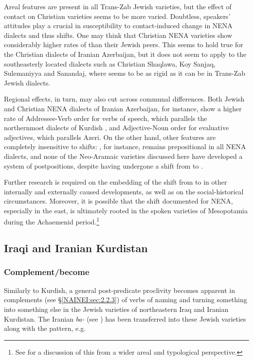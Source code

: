 \documentclass[output=paper,colorlinks,citecolor=brown,draftmode]{langscibook}
\begin{document}
Areal features are present in all Trans-Zab Jewish varieties, but the effect of contact on Christian varieties seems to be more varied. Doubtless, speakers' attitudes play a crucial  in susceptibility to contact-induced change in NENA dialects \parencite{Noorlander2014Diversity} and thus  shifts. One may think that Christian NENA varieties show considerably higher rates of  than their Jewish peers. This seems to hold true for the Christian dialects of Iranian Azerbaijan, but it does not seem to apply to the southeasterly located dialects such as Christian Shaqlawa, Koy Sanjaq, Sulemaniyya and Sanandaj, where  seems to be as rigid as it can be in Trans-Zab Jewish dialects. 

Regional effects, in turn, may also cut across communal differences. Both Jewish and Christian NENA dialects of Iranian Azerbaijan, for instance, show a higher rate of Addressee-Verb order for verbs of speech, which parallels the northernmost dialects of Kurdish \parencite{Haig2022PostPredicateCon}, and Adjective-Noun order for evaluative adjectives, which parallels Azeri. On the other hand, other features are completely insensitive to  shifts: , for instance, remains prepositional in all NENA dialects, and none of the Neo-Aramaic varieties discussed here have developed a system of postpositions, despite having undergone a shift from  to . 

Further research is required on the embedding of the shift from  to  in other internally and externally caused developments, as well as on the social-historical circumstances. Moreover, it is possible that the shift documented for NENA, especially in the east, is ultimately rooted in the spoken varieties of Mesopotamia during the Achaemenid period.\footnote{See \citet{haig_which_2023} for a discussion of this from a wider areal and typological perspective.}

\subsection{Iraqi and Iranian Kurdistan}
\subsubsection{Complement/become}\label{NAINEI:sec:3.1.1}
Similarly to Kurdish,  a general post-predicate proclivity becomes apparent in  complements (see §\ref{NAINEI:sec:2.2.3}) of verbs of naming and turning something into something else in the Jewish varieties of northeastern Iraq and Iranian Kurdistan. The Iranian  \textit{ba-} (see ) has been transferred into these Jewish varieties along with the pattern, e.g.
\end{document}
